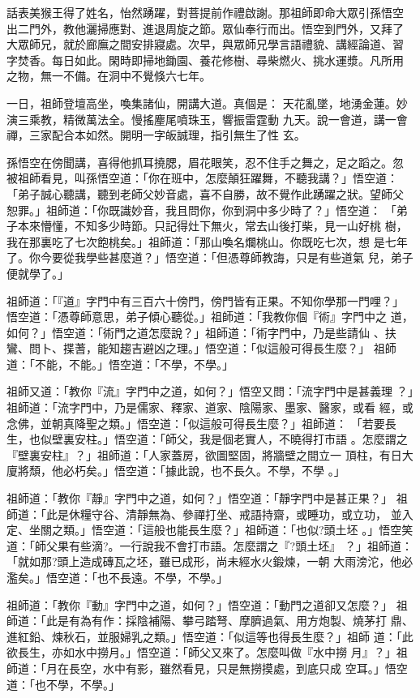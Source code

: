 \begin{pinyinscope}
{話表美猴王得了姓名，怡然踴躍，對菩提前作禮啟謝。那祖師即命大眾引孫悟空
出二門外，教他灑掃應對、進退周旋之節。眾仙奉行而出。悟空到門外，又拜了
大眾師兄，就於廊廡之間安排寢處。次早，與眾師兄學言語禮貌、講經論道、習
字焚香。每日如此。閑時即掃地鋤園、養花修樹、尋柴燃火、挑水運漿。凡所用
之物，無一不備。在洞中不覺倏六七年。

一日，祖師登壇高坐，喚集諸仙，開講大道。真個是：
天花亂墜，地湧金蓮。妙演三乘教，精微萬法全。慢搖麈尾噴珠玉，響振雷霆動
九天。說一會道，講一會禪，三家配合本如然。開明一字皈誠理，指引無生了性
玄。

孫悟空在傍聞講，喜得他抓耳撓腮，眉花眼笑，忍不住手之舞之，足之蹈之。忽
被祖師看見，叫孫悟空道：「你在班中，怎麼顛狂躍舞，不聽我講？」悟空道：
「弟子誠心聽講，聽到老師父妙音處，喜不自勝，故不覺作此踴躍之狀。望師父
恕罪。」祖師道：「你既識妙音，我且問你，你到洞中多少時了？」悟空道：
「弟子本來懵懂，不知多少時節。只記得灶下無火，常去山後打柴，見一山好桃
樹，我在那裏吃了七次飽桃矣。」祖師道：「那山喚名爛桃山。你既吃七次，想
是七年了。你今要從我學些甚麼道？」悟空道：「但憑尊師教誨，只是有些道氣
兒，弟子便就學了。」

祖師道：「『道』字門中有三百六十傍門，傍門皆有正果。不知你學那一門哩？」
悟空道：「憑尊師意思，弟子傾心聽從。」祖師道：「我教你個『術』字門中之
道，如何？」悟空道：「術門之道怎麼說？」祖師道：「術字門中，乃是些請仙
、扶鸞、問卜、揲蓍，能知趨吉避凶之理。」悟空道：「似這般可得長生麼？」
祖師道：「不能，不能。」悟空道：「不學，不學。」

祖師又道：「教你『流』字門中之道，如何？」悟空又問：「流字門中是甚義理
？」祖師道：「流字門中，乃是儒家、釋家、道家、陰陽家、墨家、醫家，或看
經，或念佛，並朝真降聖之類。」悟空道：「似這般可得長生麼？」祖師道：
「若要長生，也似壁裏安柱。」悟空道：「師父，我是個老實人，不曉得打市語
。怎麼謂之『壁裏安柱』？」祖師道：「人家蓋房，欲圖堅固，將牆壁之間立一
頂柱，有日大廈將頹，他必朽矣。」悟空道：「據此說，也不長久。不學，不學
。」

祖師道：「教你『靜』字門中之道，如何？」悟空道：「靜字門中是甚正果？」
祖師道：「此是休糧守谷、清靜無為、參禪打坐、戒語持齋，或睡功，或立功，
並入定、坐關之類。」悟空道：「這般也能長生麼？」祖師道：「也似?頭土坯
。」悟空笑道：「師父果有些滴?。一行說我不會打市語。怎麼謂之『?頭土坯』
？」祖師道：「就如那?頭上造成磚瓦之坯，雖已成形，尚未經水火鍛煉，一朝
大雨滂沱，他必濫矣。」悟空道：「也不長遠。不學，不學。」

祖師道：「教你『動』字門中之道，如何？」悟空道：「動門之道卻又怎麼？」
祖師道：「此是有為有作：採陰補陽、攀弓踏弩、摩臍過氣、用方炮製、燒茅打
鼎、進紅鉛、煉秋石，並服婦乳之類。」悟空道：「似這等也得長生麼？」祖師
道：「此欲長生，亦如水中撈月。」悟空道：「師父又來了。怎麼叫做『水中撈
月』？」祖師道：「月在長空，水中有影，雖然看見，只是無撈摸處，到底只成
空耳。」悟空道：「也不學，不學。」

}
\end{pinyinscope}
